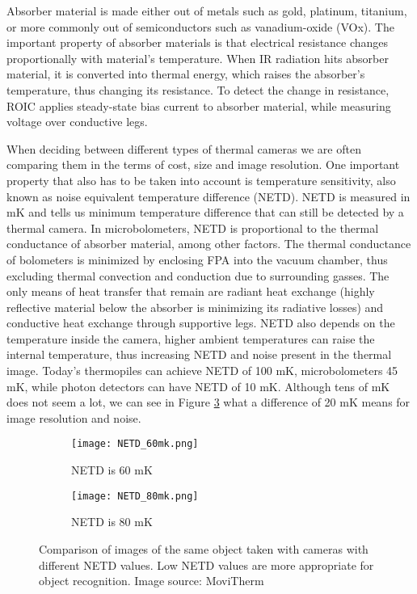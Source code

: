 Absorber material is made either out of metals such as gold, platinum, titanium, or more commonly out of semiconductors such as vanadium-oxide (VOx)\cite{thermal_article}.
The important property of absorber materials is that electrical resistance changes proportionally with material's temperature\cite{thermal_book}.
When IR radiation hits absorber material, it is converted into thermal energy, which raises the absorber's temperature, thus changing its resistance.
To detect the change in resistance, ROIC applies steady-state bias current to absorber material, while measuring voltage over conductive legs\cite{thermal_book}. 

When deciding between different types of thermal cameras we are often comparing them in the terms of cost, size and image resolution.
One important property that also has to be taken into account is temperature sensitivity, also known as noise equivalent temperature difference (NETD).
NETD is measured in \si{\milli\kelvin} and tells us minimum temperature difference that can still be detected by a thermal camera.
In microbolometers, NETD is proportional to the thermal conductance of absorber material, among other factors\cite{thermal_book}.
The thermal conductance of bolometers is minimized by enclosing FPA into the vacuum chamber, thus excluding thermal convection and conduction due to surrounding gasses.
The only means of heat transfer that remain are radiant heat exchange (highly reflective material below the absorber is minimizing its radiative losses) and conductive heat exchange through supportive legs.
NETD also depends on the temperature inside the camera, higher ambient temperatures can raise the internal temperature, thus increasing NETD and noise present in the thermal image.
Today's thermopiles can achieve NETD of 100 \si{\milli\kelvin}, microbolometers 45 \si{\milli\kelvin}, while photon detectors can have NETD of 10 \si{\milli\kelvin}.
Although tens of \si{\milli\kelvin} does not seem a lot, we can see in Figure \ref{NETD} what a difference of 20 \si{\milli\kelvin} means for image resolution and noise.
\newline

\begin{figure}[ht]
    \begin{subfigure}{0.5\textwidth}
        \centering
        \texttt{[image: NETD\_60mk.png]} 
        \caption{NETD is 60 \si{\milli\kelvin}}
        \label{NETD_60mk}
    \end{subfigure}
    \begin{subfigure}{0.5\textwidth}
        \centering
        \texttt{[image: NETD\_80mk.png]}
        \caption{NETD is 80 \si{\milli\kelvin}}
        \label{NETD_80mk}
    \end{subfigure}

    \caption{Comparison of images of the same object taken with cameras with different NETD values. Low NETD values are more appropriate for object recognition. Image source: MoviTherm \cite{NETD}}
    \label{NETD}
\end{figure}


